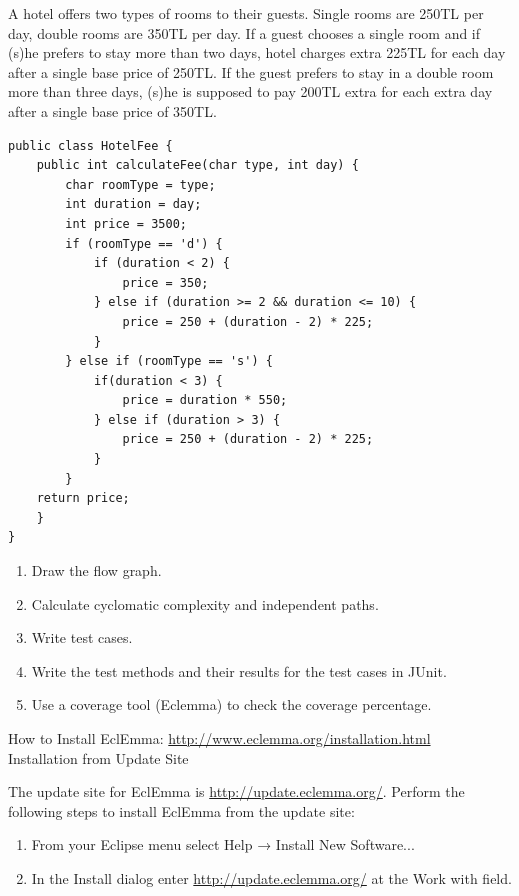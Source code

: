 \begin{exercise}
    A hotel offers two types of rooms to their guests. Single rooms are 250TL per day, double rooms are 350TL per day. If a guest chooses a single room and if (s)he prefers to stay more than two days, hotel charges extra 225TL for each day after a single base price of 250TL. If the guest prefers to stay in a double room more than three days, (s)he is supposed to pay 200TL extra for each extra day after a single base price of 350TL.

    \begin{lstlisting}[caption={A hotel fee calculation program for the above requirement.}]
public class HotelFee {
    public int calculateFee(char type, int day) {
        char roomType = type; 
        int duration = day;
        int price = 3500;
        if (roomType == 'd') {     
            if (duration < 2) {
                price = 350;
            } else if (duration >= 2 && duration <= 10) {
                price = 250 + (duration - 2) * 225;
            }
        } else if (roomType == 's') {
            if(duration < 3) {
                price = duration * 550;
            } else if (duration > 3) {
                price = 250 + (duration - 2) * 225;
            } 
        } 
    return price;
    }
}
    \end{lstlisting}
    
    \begin{enumerate}
        \item Draw the flow graph.
        \item Calculate cyclomatic complexity and independent paths.
        \item Write test cases.
        \item Write the test methods and their results for the test cases in JUnit.
        \item Use a coverage tool (Eclemma) to check the coverage percentage.
    \end{enumerate}
    
    How to Install EclEmma: \url{http://www.eclemma.org/installation.html}\\
    Installation from Update Site

    The update site for EclEmma is \url{http://update.eclemma.org/}. Perform the following steps to install EclEmma from the update site:

    \begin{enumerate}[nosep]
        \item From your Eclipse menu select Help → Install New Software...
        \item In the Install dialog enter \url{http://update.eclemma.org/} at the Work with field.
    \end{enumerate}
    

\end{exercise}
